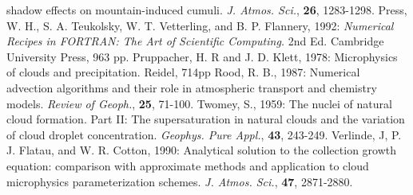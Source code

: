 shadow effects on mountain-induced cumuli. {\it J. Atmos. Sci.}, {\bf 26},
1283-1298.
\por
Press, W. H., S. A. Teukolsky, W. T. Vetterling, and B. P. Flannery, 1992:
        {\it Numerical Recipes in FORTRAN: The Art of Scientific Computing.}
        2nd Ed.
        Cambridge University Press,
        963 pp.
\por
Pruppacher, H. R and J. D. Klett, 1978: Microphysics of clouds and precipitation.
Reidel, 714pp
\por
Rood, R. B., 1987: Numerical advection algorithms and their role in atmospheric
transport and chemistry models. {\it Review of Geoph.}, {\bf 25}, 71-100.
\por
Twomey, S., 1959: The nuclei of natural cloud formation. Part II: The
        supersaturation in natural clouds and the variation of cloud droplet
        concentration.
        {\it Geophys. Pure Appl.},
        {\bf 43},
        243-249.
\por
Verlinde, J, P. J. Flatau, and W. R. Cotton, 1990:
        Analytical solution to the collection growth equation: comparison with
        approximate methods and application to cloud microphysics
        parameterization schemes.
        {\it J. Atmos. Sci.},
        {\bf 47},
        2871-2880.
